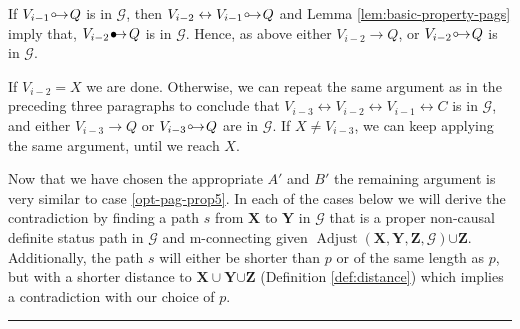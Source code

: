 \documentclass[twoside]{article}
\DeclareMathOperator{\Adjust}{Adjust}
\newcommand{\adjustb}[2][X,Y,Z]{\Adjust(\mb{#1},#2)}
\newcommand{\mb}[1]{\mathbf{#1}}
\newcommand{\g}[1][G]{\mathcal{#1}}
\newenvironment{proofof}[1][]{\begin{trivlist}
\item[\hskip \labelsep {\bfseries Proof of #1.}]}{\hfill\BlackBox\end{trivlist}}
\newcommand{\BlackBox}{\rule{1.5ex}{1.5ex}}
\newcommand{\bulletarrow}{
  \setlength{\unitlength}{1mm}
  \begin{picture}(5,1)(0,0)
    \put(0.2,0){$\bullet$}
    \put(1,0){$\rightarrow$}
  \end{picture}
}
\newcommand{\circarrow}{
  \setlength{\unitlength}{1mm}
  \begin{picture}(5,1)(0,0)
    \put(1,1){\circle{1}}
    \put(1.2,0){$\rightarrow$}
  \end{picture}
}
\begin{document}
\begin{proofof}[Lemma \ref{lem:adjust-and-o-pag-helper}]
\begin{itemize}
        If $V_{i-1} \circarrow Q$ is in $\g$, then $V_{i-2} \leftrightarrow V_{i-1} \circarrow Q$ and Lemma \ref{lem:basic-property-pags} imply that, $V_{i-2} \bulletarrow Q$ is in $\g$. Hence, as above either $V_{i-2} \to Q$, or $V_{i-2} \circarrow Q$ is in $\g.$
        
        If $V_{i-2} = X$ we are done. Otherwise, we can repeat the same argument as in the preceding three paragraphs to conclude that $V_{i-3} \leftrightarrow V_{i-2} \leftrightarrow V_{i-1} \leftrightarrow C$ is in $\g$, and either $V_{i-3} \to Q$ or $V_{i-3} \circarrow Q$ are in $\g$. If $X \neq V_{i-3}$, we can keep applying the same argument, until we reach $X$.
    \end{itemize}

    Now that we have chosen the appropriate $A'$ and $B'$ the remaining argument is very similar to case \ref{opt-pag-prop5}.  In each of the cases below we will derive the contradiction by finding a path $s$ from $\mb{X}$ to $\mb{Y}$ in $\g$ that is a proper non-causal definite status path in $\g$ and m-connecting given $\adjustb{\g} {\cup \mb{Z}}$. Additionally, the path $s$ will either be shorter than $p$ or of the same length as $p$, but with a shorter distance to $\mb{X} \cup \mb{Y} {\cup \mb{Z}}$ (Definition \ref{def:distance}) which implies a contradiction with our choice of $p$.


\end{proofof}
\end{document}
